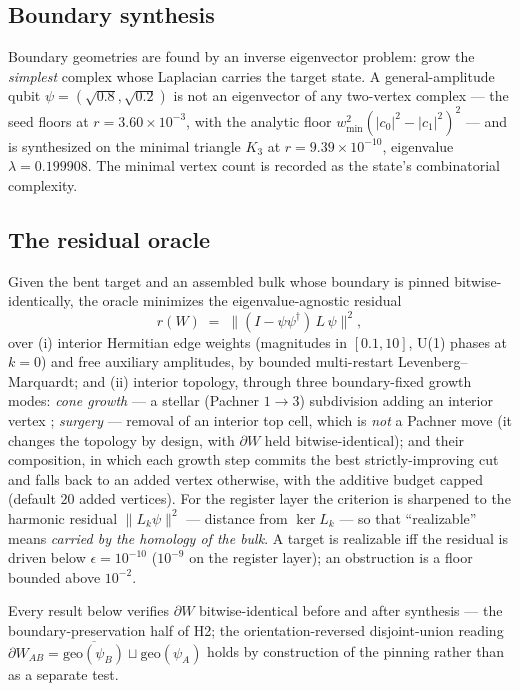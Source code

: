 \documentclass[a4paper,twocolumn,11pt,unpublished]{quantumarticle}
\theoremstyle{plain}
\theoremstyle{remark}
\newcommand{\geo}{\mathrm{geo}}
\newcommand{\kerL}{\ker L}
\begin{document}
\subsection{Boundary synthesis}
\label{sec:boundary}

Boundary geometries are found by an inverse eigenvector problem: grow the
\emph{simplest} complex whose Laplacian carries the target state. A
general-amplitude qubit $\psi=(\sqrt{0.8},\sqrt{0.2})$ is not an
eigenvector of any two-vertex complex --- the seed floors at
$r=3.60\times10^{-3}$, with the analytic floor
$w_{\min}^2(|c_0|^2-|c_1|^2)^2$ --- and is synthesized on the minimal
triangle $K_3$ at $r=9.39\times10^{-10}$, eigenvalue $\lambda=0.199908$.
The minimal vertex count is recorded as the state's combinatorial
complexity.

\subsection{The residual oracle}
\label{sec:oracle}

Given the bent target and an assembled bulk whose boundary is pinned
bitwise-identically, the oracle minimizes the eigenvalue-agnostic residual
\begin{equation}
  r(W)\;=\;\bigl\lVert (I-\psi\psi^\dagger)\,L\,\psi \bigr\rVert^2,
  \label{eq:residual}
\end{equation}
over (i) interior Hermitian edge weights (magnitudes in $[0.1,10]$, U(1)
phases at $k=0$) and free auxiliary amplitudes, by bounded multi-restart
Levenberg--Marquardt; and (ii) interior topology, through three
boundary-fixed growth modes: \emph{cone growth} --- a stellar (Pachner
$1\to3$) subdivision adding an interior vertex
\cite{Pachner1987Bistellar,Pachner1991Shellings}; \emph{surgery} ---
removal of an interior top cell, which is \emph{not} a Pachner move (it
changes the topology by design, with $\partial W$ held
bitwise-identical); and their composition, in which each growth step
commits the best strictly-improving cut and falls back to an added vertex
otherwise, with the additive budget capped (default $20$ added vertices).
For the register layer the criterion is sharpened to the harmonic residual
$\lVert L_k\psi\rVert^2$ --- distance from $\kerL_k$ --- so that
``realizable'' means \emph{carried by the homology of the bulk}. A target
is realizable iff the residual is driven below $\epsilon=10^{-10}$
($10^{-9}$ on the register layer); an obstruction is a floor bounded above
$10^{-2}$.

Every result below verifies $\partial W$ bitwise-identical before and
after synthesis --- the boundary-preservation half of H2; the
orientation-reversed disjoint-union reading
$\partial W_{AB}=\overline{\geo(\psi_B)}\sqcup\geo(\psi_A)$ holds by
construction of the pinning rather than as a separate test.
\end{document}
